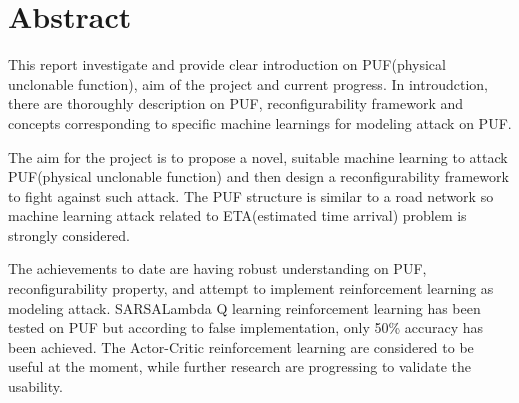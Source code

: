 \chapter*{\Large \center Abstract}
\setlength{\parskip}{\baselineskip}%
\setlength{\parindent}{0pt}%


This report investigate and provide clear introduction on PUF(physical unclonable function), aim of the project and current progress.
In introudction, there are thoroughly description on PUF, reconfigurability framework and concepts corresponding to specific machine learnings for modeling attack on PUF.
\par

The aim for the project is to propose a novel, suitable machine learning to attack PUF(physical unclonable function)
and then design a reconfigurability framework to fight against such attack. The PUF structure is similar to a road network so 
machine learning attack related to ETA(estimated time arrival) problem is strongly considered.
\par

The achievements to date are having robust understanding on PUF, reconfigurability property, and attempt to implement reinforcement learning as modeling attack. 
SARSALambda Q learning reinforcement learning has been tested on PUF but according to false implementation, only 50\% accuracy has been achieved.
The Actor-Critic reinforcement learning are considered to be useful at the moment, while further research are progressing to validate the usability.

